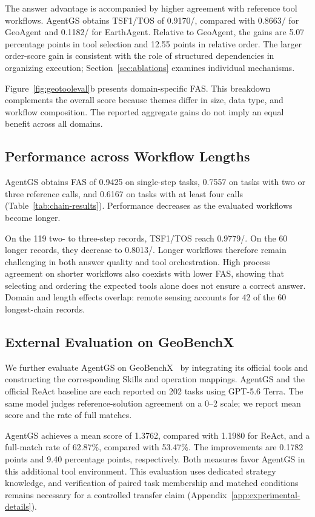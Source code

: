The answer advantage is accompanied by higher agreement with reference tool workflows. AgentGS obtains TSF1/TOS of 0.9170/, compared with 0.8663/ for GeoAgent and 0.1182/ for EarthAgent. Relative to GeoAgent, the gains are 5.07 percentage points in tool selection and 12.55 points in relative order. The larger order-score gain is consistent with the role of structured dependencies in organizing execution; Section~\ref{sec:ablations} examines individual mechanisms.

Figure~\ref{fig:geotooleval}b presents domain-specific FAS. This breakdown complements the overall score because themes differ in size, data type, and workflow composition. The reported aggregate gains do not imply an equal benefit across all domains.

\subsection{Performance across Workflow Lengths}
AgentGS obtains FAS of 0.9425 on single-step tasks, 0.7557 on tasks with two or three reference calls, and 0.6167 on tasks with at least four calls (Table~\ref{tab:chain-results}). Performance decreases as the evaluated workflows become longer.


On the 119 two- to three-step records, TSF1/TOS reach 0.9779/. On the 60 longer records, they decrease to 0.8013/. Longer workflows therefore remain challenging in both answer quality and tool orchestration. High process agreement on shorter workflows also coexists with lower FAS, showing that selecting and ordering the expected tools alone does not ensure a correct answer. Domain and length effects overlap: remote sensing accounts for 42 of the 60 longest-chain records.

\subsection{External Evaluation on GeoBenchX}
\label{sec:external-evaluation}
We further evaluate AgentGS on GeoBenchX~\cite{krechetova2025geobenchx} by integrating its official tools and constructing the corresponding Skills and operation mappings. AgentGS and the official ReAct baseline are each reported on 202 tasks using GPT-5.6 Terra. The same model judges reference-solution agreement on a 0--2 scale; we report mean score and the rate of full matches.


AgentGS achieves a mean score of 1.3762, compared with 1.1980 for ReAct, and a full-match rate of 62.87\%, compared with 53.47\%. The improvements are 0.1782 points and 9.40 percentage points, respectively. Both measures favor AgentGS in this additional tool environment. This evaluation uses dedicated strategy knowledge, and verification of paired task membership and matched conditions remains necessary for a controlled transfer claim (Appendix~\ref{app:experimental-details}).
